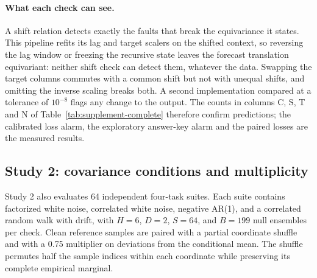 \documentclass[11pt,a4paper]{article}
\begin{document}
\paragraph{What each check can see.} A shift relation detects exactly the
faults that break the equivariance it states. This pipeline refits its lag
and target scalers on the shifted context, so reversing the lag window or
freezing the recursive state leaves the forecast translation equivariant:
neither shift check can detect them, whatever the data. Swapping the target
columns commutes with a common shift but not with unequal shifts, and
omitting the inverse scaling breaks both. A second implementation compared
at a tolerance of $10^{-8}$ flags any change to the output. The counts in
columns C, S, T and N of Table~\ref{tab:supplement-complete} therefore
confirm predictions; the calibrated loss alarm, the exploratory answer-key
alarm and the paired losses are the measured results.

\subsection{Study 2: covariance conditions and multiplicity}

Study 2 also evaluates 64 independent four-task suites. Each
suite contains factorized white noise, correlated white noise, negative
AR(1), and a correlated random walk with drift, with $H=6$, $D=2$, $S=64$, and
$B=199$ null ensembles per check. Clean reference samples are paired with
a partial coordinate shuffle and with a 0.75 multiplier on deviations
from the conditional mean. The shuffle permutes half the sample indices
within each coordinate while preserving its complete empirical marginal.
\end{document}
